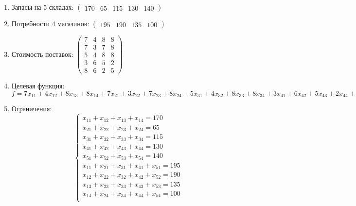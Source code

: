 \begin{enumerate}
    \item Запасы на 5 складах: $\begin{pmatrix}
                  170 & 65 & 115 & 130 & 140
              \end{pmatrix}$
    \item Потребности 4 магазинов: $\begin{pmatrix}
                  195 & 190 & 135 & 100
              \end{pmatrix}$
    \item Стоимость поставок: $\begin{pmatrix}
                  7 & 4 & 8 & 8 \\
                  7 & 3 & 7 & 8 \\
                  5 & 4 & 8 & 8 \\
                  3 & 6 & 5 & 2 \\
                  8 & 6 & 2 & 5
              \end{pmatrix}$
    \item Целевая функция: $f = 7x_{11} + 4x_{12} + 8x_{13} + 8x_{14} + 7x_{21} + 3x_{22} + 7x_{23} + 8x_{24} + 5x_{31} + 4x_{32} + 8x_{33} + 8x_{34} + 3x_{41} + 6x_{42} + 5x_{43} + 2x_{44} + 8x_{51} + 6x_{52} + 2x_{53} + 5x_{54} \to \min$

    \item Ограничения:
          \[\begin{cases}
                  x_{11} + x_{12} + x_{13} + x_{14} = 170          \\
                  x_{21} + x_{22} + x_{23} + x_{24} = 65           \\
                  x_{31} + x_{32} + x_{33} + x_{34} = 115          \\
                  x_{41} + x_{42} + x_{43} + x_{44} = 130          \\
                  x_{51} + x_{52} + x_{53} + x_{54} = 140          \\
                  x_{11} + x_{21} + x_{31} + x_{41} + x_{51} = 195 \\
                  x_{12} + x_{22} + x_{32} + x_{42} + x_{52} = 190 \\
                  x_{13} + x_{23} + x_{33} + x_{43} + x_{53} = 135 \\
                  x_{14} + x_{24} + x_{34} + x_{44} + x_{54} = 100 \\
              \end{cases}\]
\end{enumerate}

